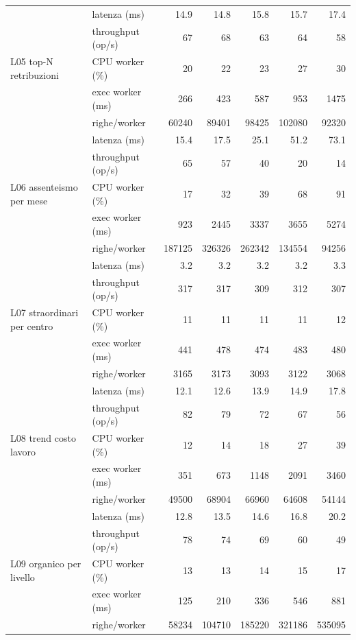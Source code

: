 \begin{longtable}{@{}llrrrrr@{}}
\multirow{5}{*}{L05 top-N retribuzioni} & latenza (ms)     & 14.9 & 14.8 & 15.8 & 15.7 & 17.4 \\
 & throughput (op/s) & 67 & 68 & 63 & 64 & 58 \\
 & CPU worker (\%)   & 20 & 22 & 23 & 27 & 30 \\
 & exec worker (ms)  & 266 & 423 & 587 & 953 & 1475 \\
 & righe/worker      & 60240 & 89401 & 98425 & 102080 & 92320 \\ \midrule
\multirow{5}{*}{L06 assenteismo per mese} & latenza (ms)     & 15.4 & 17.5 & 25.1 & 51.2 & 73.1 \\
 & throughput (op/s) & 65 & 57 & 40 & 20 & 14 \\
 & CPU worker (\%)   & 17 & 32 & 39 & 68 & 91 \\
 & exec worker (ms)  & 923 & 2445 & 3337 & 3655 & 5274 \\
 & righe/worker      & 187125 & 326326 & 262342 & 134554 & 94256 \\ \midrule
\multirow{5}{*}{L07 straordinari per centro} & latenza (ms)     & 3.2 & 3.2 & 3.2 & 3.2 & 3.3 \\
 & throughput (op/s) & 317 & 317 & 309 & 312 & 307 \\
 & CPU worker (\%)   & 11 & 11 & 11 & 11 & 12 \\
 & exec worker (ms)  & 441 & 478 & 474 & 483 & 480 \\
 & righe/worker      & 3165 & 3173 & 3093 & 3122 & 3068 \\ \midrule
\multirow{5}{*}{L08 trend costo lavoro} & latenza (ms)     & 12.1 & 12.6 & 13.9 & 14.9 & 17.8 \\
 & throughput (op/s) & 82 & 79 & 72 & 67 & 56 \\
 & CPU worker (\%)   & 12 & 14 & 18 & 27 & 39 \\
 & exec worker (ms)  & 351 & 673 & 1148 & 2091 & 3460 \\
 & righe/worker      & 49500 & 68904 & 66960 & 64608 & 54144 \\ \midrule
\multirow{5}{*}{L09 organico per livello} & latenza (ms)     & 12.8 & 13.5 & 14.6 & 16.8 & 20.2 \\
 & throughput (op/s) & 78 & 74 & 69 & 60 & 49 \\
 & CPU worker (\%)   & 13 & 13 & 14 & 15 & 17 \\
 & exec worker (ms)  & 125 & 210 & 336 & 546 & 881 \\
 & righe/worker      & 58234 & 104710 & 185220 & 321186 & 535095 \\ \midrule

\end{longtable}
